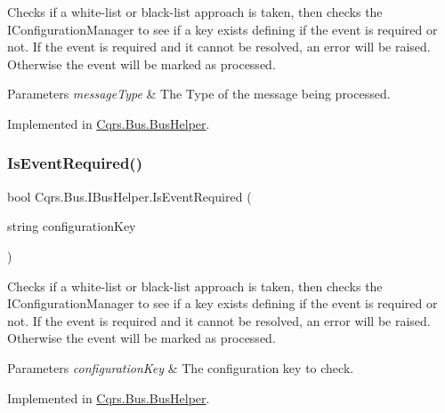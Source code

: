 Checks if a white-\/list or black-\/list approach is taken, then checks the I\+Configuration\+Manager to see if a key exists defining if the event is required or not. If the event is required and it cannot be resolved, an error will be raised. Otherwise the event will be marked as processed. 


\begin{DoxyParams}{Parameters}
{\em message\+Type} & The Type of the message being processed.\\
\hline
\end{DoxyParams}


Implemented in \hyperlink{classCqrs_1_1Bus_1_1BusHelper_a28c675e976adbf348637ec6ff6410c1a}{Cqrs.\+Bus.\+Bus\+Helper}.

\mbox{\label{interfaceCqrs_1_1Bus_1_1IBusHelper_af73d0d2aa8e98566acb4b2fb13a3e986}} 
\subsubsection{\texorpdfstring{Is\+Event\+Required()}{IsEventRequired()}\hspace{0.1cm}{\footnotesize\ttfamily [2/2]}}
{\footnotesize\ttfamily bool Cqrs.\+Bus.\+I\+Bus\+Helper.\+Is\+Event\+Required (\begin{DoxyParamCaption}\item[{string}]{configuration\+Key }\end{DoxyParamCaption})}



Checks if a white-\/list or black-\/list approach is taken, then checks the I\+Configuration\+Manager to see if a key exists defining if the event is required or not. If the event is required and it cannot be resolved, an error will be raised. Otherwise the event will be marked as processed. 


\begin{DoxyParams}{Parameters}
{\em configuration\+Key} & The configuration key to check.\\
\hline
\end{DoxyParams}


Implemented in \hyperlink{classCqrs_1_1Bus_1_1BusHelper_a60a9603d5c6b7f29ee42491475714895}{Cqrs.\+Bus.\+Bus\+Helper}.

